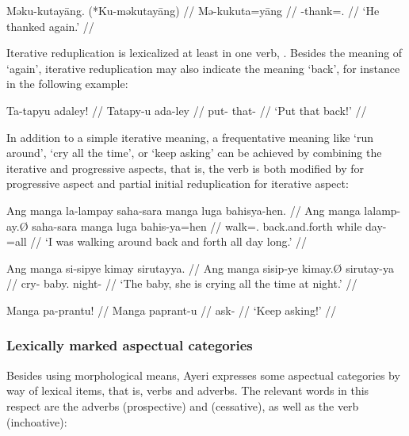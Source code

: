 \ex\begingl
	\gla Məku-kutayāng. \quad \textup{(*}Ku-məkutayāng\textup{)} //
	\glb Mə-ku\til{}kuta=yāng //
	\glc \Pst{}-\Iter{}\til{}thank=\TsgM{}.\Aarg{} //
	\glft `He thanked again.' //
\endgl\xe

Iterative reduplication is lexicalized at least in one verb, 
. Besides the meaning of `again', iterative 
reduplication may also indicate the meaning `back', for instance in the 
following example:

\ex\begingl
	\gla Ta-tapyu adaley! //
	\glb Ta\til{}tapy-u ada-ley //
	\glc \Iter{}\til{}put-\Imp{} that-\PargI{} //
	\glft `Put that back!' //
\endgl\xe

In addition to a simple iterative meaning, a frequentative meaning like `run 
around', `cry all the time', or `keep asking' can be achieved by combining the 
iterative and progressive aspects, that is, the verb is both modified by 
 for progressive aspect and partial initial reduplication for 
iterative aspect:

\pex
\a\begingl
	\gla Ang manga la-lampay saha-sara manga luga bahisya-hen. //
	\glb Ang manga la\til{}lamp-ay.Ø saha-sara manga luga bahis-ya=hen //
	\glc \AgtT{} \Prog{} \Iter{}\til{}walk=\Fsg{}.\Top{} back.and.forth 
		\Dyn{} while day-\Loc{}=all //
	\glft `I was walking around back and forth all day long.' //
\endgl

\a\begingl
	\gla Ang manga si-sipye kimay sirutayya. //
	\glb Ang manga si\til{}sip-ye kimay.Ø sirutay-ya //
	\glc \AgtT{} \Prog{} \Iter{}\til{}cry-\TsgF{} baby.\Top{} 
		night-\Loc{} //
	\glft `The baby, she is crying all the time at night.' //
\endgl

\a\begingl
	\gla Manga pa-prantu! //
	\glb Manga pa\til{}prant-u //
	\glc \Prog{} \Iter{}\til{}ask-\Imp{} //
	\glft `Keep asking!' //
\endgl

\xe


\subsubsection{Lexically marked aspectual categories}

Besides using morphological means, Ayeri expresses some aspectual categories by 
way of lexical items, that is, verbs and adverbs. The relevant words in this 
respect are the adverbs  
(prospective) and  (cessative), as well as 
the verb  (inchoative):

